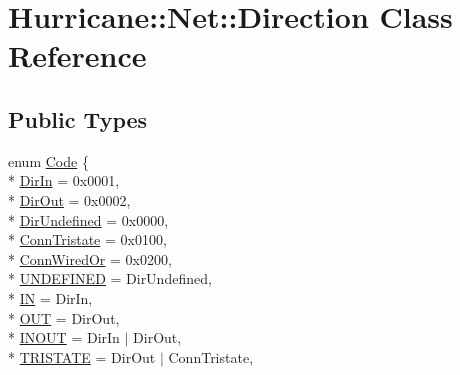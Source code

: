 \hypertarget{classHurricane_1_1Net_1_1Direction}{\section{Hurricane\-:\-:Net\-:\-:Direction Class Reference}
\label{classHurricane_1_1Net_1_1Direction}
}
\subsection*{Public Types}
\begin{DoxyCompactItemize}
\item 
enum \hyperlink{classHurricane_1_1Net_1_1Direction_a5b34d7c3ac52628861af3a46f781fae4}{Code} \{ \\*
\hyperlink{classHurricane_1_1Net_1_1Direction_a5b34d7c3ac52628861af3a46f781fae4a36971421023586a2b5b019f468d699ba}{Dir\-In} = 0x0001, 
\\*
\hyperlink{classHurricane_1_1Net_1_1Direction_a5b34d7c3ac52628861af3a46f781fae4a1135f8c6a05d3801c43684bc195f66f0}{Dir\-Out} = 0x0002, 
\\*
\hyperlink{classHurricane_1_1Net_1_1Direction_a5b34d7c3ac52628861af3a46f781fae4a368b35a5f289879ad5c6862dfebc1b96}{Dir\-Undefined} = 0x0000, 
\\*
\hyperlink{classHurricane_1_1Net_1_1Direction_a5b34d7c3ac52628861af3a46f781fae4afa0b4523129378e11f6e9bdc72fba627}{Conn\-Tristate} = 0x0100, 
\\*
\hyperlink{classHurricane_1_1Net_1_1Direction_a5b34d7c3ac52628861af3a46f781fae4a03861307a54d5204f34c74365aa58f04}{Conn\-Wired\-Or} = 0x0200, 
\\*
\hyperlink{classHurricane_1_1Net_1_1Direction_a5b34d7c3ac52628861af3a46f781fae4ad15ab42a0127de740e1c2c05841c153a}{U\-N\-D\-E\-F\-I\-N\-E\-D} = Dir\-Undefined, 
\\*
\hyperlink{classHurricane_1_1Net_1_1Direction_a5b34d7c3ac52628861af3a46f781fae4aae6e926e7787f90824a4ee961e6ddac1}{I\-N} = Dir\-In, 
\\*
\hyperlink{classHurricane_1_1Net_1_1Direction_a5b34d7c3ac52628861af3a46f781fae4a2dac58452d767718df817bcf65906969}{O\-U\-T} = Dir\-Out, 
\\*
\hyperlink{classHurricane_1_1Net_1_1Direction_a5b34d7c3ac52628861af3a46f781fae4aa88aea57d992b95a08c24716b5265afd}{I\-N\-O\-U\-T} = Dir\-In $|$ Dir\-Out, 
\\*
\hyperlink{classHurricane_1_1Net_1_1Direction_a5b34d7c3ac52628861af3a46f781fae4a71a487a8129c354630d5e989d3994c98}{T\-R\-I\-S\-T\-A\-T\-E} = Dir\-Out $|$ Conn\-Tristate, 

\end{DoxyCompactItemize}
